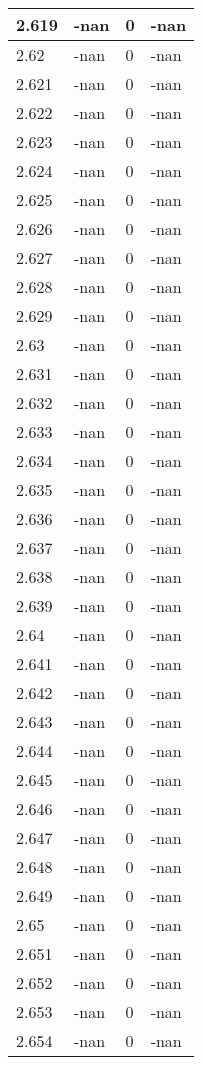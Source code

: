\documentclass[a4paper,14pt]{extarticle}
\begin{document}
\begin{longtable}{||m{3cm}||m{3cm}|m{3cm}||m{3cm}||}
\hline
2.619 & -nan & 0 & -nan\\
\hline
2.62 & -nan & 0 & -nan\\
\hline
2.621 & -nan & 0 & -nan\\
\hline
2.622 & -nan & 0 & -nan\\
\hline
2.623 & -nan & 0 & -nan\\
\hline
2.624 & -nan & 0 & -nan\\
\hline
2.625 & -nan & 0 & -nan\\
\hline
2.626 & -nan & 0 & -nan\\
\hline
2.627 & -nan & 0 & -nan\\
\hline
2.628 & -nan & 0 & -nan\\
\hline
2.629 & -nan & 0 & -nan\\
\hline
2.63 & -nan & 0 & -nan\\
\hline
2.631 & -nan & 0 & -nan\\
\hline
2.632 & -nan & 0 & -nan\\
\hline
2.633 & -nan & 0 & -nan\\
\hline
2.634 & -nan & 0 & -nan\\
\hline
2.635 & -nan & 0 & -nan\\
\hline
2.636 & -nan & 0 & -nan\\
\hline
2.637 & -nan & 0 & -nan\\
\hline
2.638 & -nan & 0 & -nan\\
\hline
2.639 & -nan & 0 & -nan\\
\hline
2.64 & -nan & 0 & -nan\\
\hline
2.641 & -nan & 0 & -nan\\
\hline
2.642 & -nan & 0 & -nan\\
\hline
2.643 & -nan & 0 & -nan\\
\hline
2.644 & -nan & 0 & -nan\\
\hline
2.645 & -nan & 0 & -nan\\
\hline
2.646 & -nan & 0 & -nan\\
\hline
2.647 & -nan & 0 & -nan\\
\hline
2.648 & -nan & 0 & -nan\\
\hline
2.649 & -nan & 0 & -nan\\
\hline
2.65 & -nan & 0 & -nan\\
\hline
2.651 & -nan & 0 & -nan\\
\hline
2.652 & -nan & 0 & -nan\\
\hline
2.653 & -nan & 0 & -nan\\
\hline
2.654 & -nan & 0 & -nan\\

\end{longtable}
\end{document}
